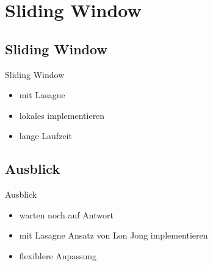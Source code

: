 \section{Sliding Window}

\subsection{Sliding Window}

\begin{frame}{Sliding Window}
    \begin{itemize}
        \item mit Lasagne 
        \item lokales implementieren
        \item lange Laufzeit 
    \end{itemize}
\end{frame}


\subsection{Ausblick}
\begin{frame}{Ausblick}
    \begin{itemize}
       \item warten noch auf Antwort 
        \item mit Lasagne Ansatz von Lon Jong implementieren
        \item flexiblere Anpassung
    \end{itemize}
\end{frame}